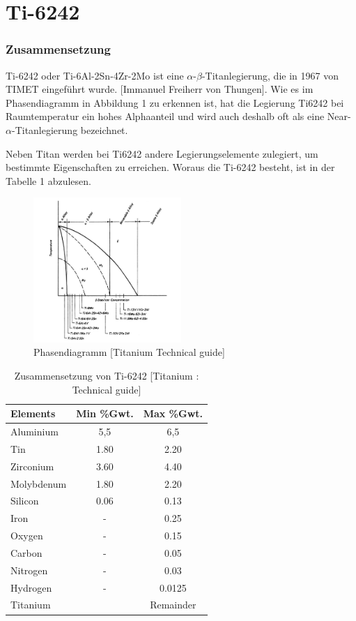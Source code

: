 \section{Ti-6242}

\subsubsection{Zusammensetzung}
Ti-6242 oder Ti-6Al-2Sn-4Zr-2Mo ist eine $\alpha$-$\beta$-Titanlegierung, die  in 1967 von TIMET eingeführt wurde. [Immanuel Freiherr von Thungen]. 
Wie es im Phasendiagramm in Abbildung 1 zu erkennen ist, hat die Legierung Ti6242 bei Raumtemperatur ein hohes Alphaanteil und wird auch deshalb oft als eine Near-$\alpha$-Titanlegierung bezeichnet.

Neben Titan werden bei Ti6242 andere Legierungselemente zulegiert, um bestimmte Eigenschaften zu erreichen. Woraus die Ti-6242 besteht, ist in der Tabelle 1 abzulesen.


\begin{figure}[H]
	\centering
	\includegraphics[width=0.5\textwidth]{Bilder/Phasendiagram}
	\caption{Phasendiagramm [Titanium Technical guide]}
	\label{PD-Ti6242}
\end{figure}





\begin{table}[H]
	
	\centering	
	\begin{tabular}{|l |c |c|}
		\hline
		\centering
		\hspace{20ex}Elements \hspace{20ex} & Min \%Gwt. & Max \%Gwt.\\
		\hline
		Aluminium&5,5&6,5\\
		Tin&1.80&2.20\\
		Zirconium&3.60&4.40\\
		Molybdenum&1.80&2.20\\
		Silicon &0.06&0.13\\
		Iron&-&0.25\\
		Oxygen&-&0.15\\
		Carbon&	-&	0.05\\
		Nitrogen&-&0.03\\
		Hydrogen&-&0.0125\\
		
		Titanium &&Remainder\\
		\hline
	\end{tabular}
	\caption{Zusammensetzung von Ti-6242 [Titanium : Technical guide]}
\end{table}


